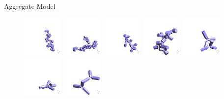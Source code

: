 \documentclass[12pt]{beamer}
\begin{document}
\begin{frame}{Aggregate Model}
\begin{figure}
    \includegraphics[width = 0.18\textwidth]{Figures/aggregates/aggregate1510.png}
    \includegraphics[width = 0.18\textwidth]{Figures/aggregates/aggregate1630.png}
    \includegraphics[width = 0.18\textwidth]{Figures/aggregates/aggregate1700.png}
    \includegraphics[width = 0.18\textwidth]{Figures/aggregates/aggregate1759.png}
    \includegraphics[width = 0.18\textwidth]{Figures/aggregates/aggregate1860.png}
    \hfill
    \includegraphics[width = 0.18\textwidth]{Figures/aggregates/aggregate1988.png}
    \includegraphics[width = 0.18\textwidth]{Figures/aggregates/aggregate2121.png}

\end{figure}
\end{frame}
\end{document}
